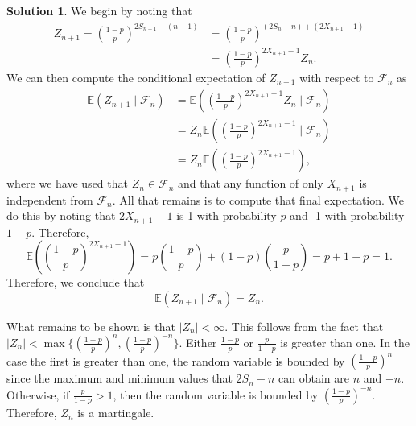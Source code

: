 \documentclass[12pt]{article}
\newcommand{\calF}{\mathcal{F}}
\newcommand{\abs}[1]{ \left| #1 \right| }
\newcommand{\Expect}{\mathbb{E}}
\theoremstyle{definition}
\newtheorem{sol}{Solution}
\theoremstyle{remark}
\begin{document}
\begin{sol}
We begin by noting that 
\begin{align}
    Z_{n+1} = \left(\frac{1-p}{p}\right)^{2 S_{n+1} - (n+1)} &= \left(\frac{1-p}{p}\right)^{(2 S_{n} - n) + (2X_{n+1}-1)} \\
                                                             &=  \left(\frac{1-p}{p}\right)^{ 2X_{n+1}-1}Z_n. 
\end{align}
We can then compute the conditional expectation of $Z_{n+1}$ with respect to $\calF_n$ as 
\begin{align}
    \Expect(Z_{n+1}\mid \calF_n) &= \Expect\left(  \left(\frac{1-p}{p}\right)^{ 2X_{n+1}-1}Z_n\mid \calF_n \right)\\
                                 &= Z_n \Expect\left( \left(\frac{1-p}{p}\right)^{ 2X_{n+1}-1} \mid \calF_n \right)\\
                                 &= Z_n \Expect\left( \left(\frac{1-p}{p}\right)^{ 2X_{n+1}-1} \right),
\end{align}
where we have used that $Z_n\in\calF_n$ and that any function of only $X_{n+1}$ is independent from $\calF_n$. All that remains is to compute that final expectation. We do this by noting that $2X_{n+1} - 1$ is 1 with probability $p$ and -1 with probability $1-p$. Therefore,
\begin{equation}
    \Expect\left( \left(\frac{1-p}{p}\right)^{ 2X_{n+1}-1} \right) = p  \left(\frac{1-p}{p}\right) + (1-p) \left(\frac{p}{1-p}\right) = p + 1 - p = 1.
\end{equation}
Therefore, we conclude that 
\begin{equation}
   \Expect(Z_{n+1}\mid \calF_n) = Z_n.
\end{equation}

What remains to be shown is that $\abs{Z_n} < \infty$. This follows from the fact that $\abs{Z_n} < \max \{ \left( \frac{1-p}{p}  \right)^n,  \left( \frac{1-p}{p}  \right)^{-n}\}$. Either $ \frac{1-p}{p}$ or $\frac{p}{1-p}$ is greater than one. In the case the first is greater than one, the random variable is bounded by $\left( \frac{1-p}{p}  \right)^n$ since the maximum and minimum values that $2S_n - n$ can obtain are $n$ and $-n$. Otherwise, if $\frac{p}{1-p} > 1$, then the random variable is bounded by $\left( \frac{1-p}{p}  \right)^{-n}$. Therefore, $Z_{n}$ is a martingale.
\end{sol}
\newpage 
\end{document}
